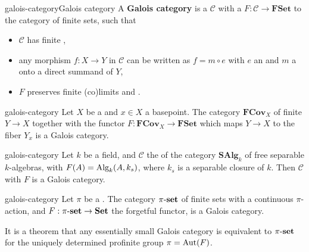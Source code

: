 \begin{topic}{galois-category}{Galois category}
    A \textbf{Galois category} is a  $\mathcal{C}$ with a  $F : \mathcal{C} \to \textbf{FSet}$ to the category of finite sets, such that
    \begin{itemize}
        \item $\mathcal{C}$ has finite ,
        \item any morphism $f : X \to Y$ in $\mathcal{C}$ can be written as $f = m \circ e$ with $e$ an  and $m$ a  onto a direct summand of $Y$,
        \item $F$ preserves finite (co)limits and .
    \end{itemize}
\end{topic}

\begin{example}{galois-category}
    Let $X$ be a   and $x \in X$ a basepoint. The category $\textbf{FCov}_X$ of finite  $Y \to X$ together with the functor $F : \textbf{FCov}_X \to \textbf{FSet}$ which maps $Y \to X$ to the fiber $Y_x$ is a Galois category.
\end{example}

\begin{example}{galois-category}
    Let $k$ be a field, and $\mathcal{C}$ the  of the category $\textbf{SAlg}_k$ of free separable $k$-algebras, with $F(A) = \textup{Alg}_k(A, k_s)$, where $k_s$ is a separable closure of $k$. Then $\mathcal{C}$ with $F$ is a Galois category.
\end{example}

\begin{example}{galois-category}
    Let $\pi$ be a . The category $\pi\textup{-}\textbf{set}$ of finite sets with a continuous $\pi$-action, and $F : \pi\textup{-}\textbf{set} \to \textbf{Set}$ the forgetful functor, is a Galois category.
    
    It is a theorem that any essentially small Galois category is equivalent to $\pi\textup{-}\textbf{set}$ for the uniquely determined profinite group $\pi = \textup{Aut}(F)$.
\end{example}

